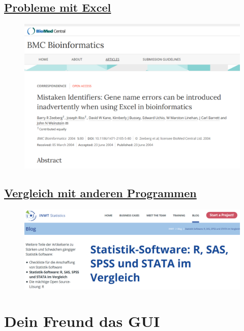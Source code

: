 \documentclass[]{article}
\begin{document}
\subsection{\texorpdfstring{\href{http://www.biomedcentral.com/1471-2105/5/80}{Probleme
mit Excel}}{Probleme mit Excel}}\label{probleme-mit-excel-1}

\begin{figure}[htbp]
\centering
\includegraphics{figure/ExcelProblems.PNG}
\caption{}
\end{figure}

\subsection{\texorpdfstring{\href{https://www.inwt-statistics.de/blog-artikel-lesen/Statistik-Software-R_SAS_SPSS_STATA_im_Vergleich.html}{Vergleich
mit anderen
Programmen}}{Vergleich mit anderen Programmen}}\label{vergleich-mit-anderen-programmen}

\begin{figure}[htbp]
\centering
\includegraphics{figure/SoftwareVergleich.PNG}
\caption{}
\end{figure}

\section{Dein Freund das GUI}\label{dein-freund-das-gui}
\end{document}

